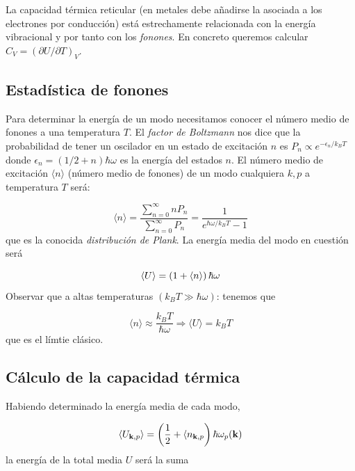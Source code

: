 La capacidad térmica reticular (en metales debe añadirse la asociada a los electrones por conducción) está estrechamente relacionada con la energía vibracional y por tanto con los \textit{fonones}. En concreto queremos calcular $C_V = (\partial U / \partial T)_V$. 

\subsection{Estadística de fonones}

Para determinar la energía de un modo necesitamos conocer el número medio de fonones a una temperatura $T$. El \textit{factor de Boltzmann} nos dice que la probabilidad de tener un oscilador en un estado de excitación $n$ es $P_n \propto e^{-\epsilon_n/k_B T}$ donde $\epsilon_n = (1/2+n)\hbar \omega$ es la energía del estados $n$. El número medio de excitación $\langle n \rangle$ (número medio de fonones) de un modo cualquiera $k,p$ a temperatura $T$ será:

\begin{equation}
    \langle n \rangle = \frac{\sum_{n=0}^\infty n P_n}{\sum_{n=0}^{\infty} P_n} = \frac{1}{e^{\hbar \omega/k_B T} -1}
\end{equation}
que es la conocida \textit{distribución de Plank}. La energía media del modo en cuestión será

\begin{equation}
    \langle U \rangle = \left( 1+\langle n \rangle \right) \hbar \omega
\end{equation}
Observar que a altas temperaturas $(k_B T \gg \hbar \omega)$: tenemos que

\begin{equation}
    \langle n \rangle \approx \frac{k_B T}{\hbar \omega} \Longrightarrow \langle U \rangle = k_B T
\end{equation}
que es el límtie clásico. 
\subsection{Cálculo de la capacidad térmica}

Habiendo determinado la energía media de cada modo,

\begin{equation*}
    \langle U_{\mathbf{k},p} \rangle = \left( \frac{1}{2} + \langle n_{\mathbf{k},p}  \right) \hbar \omega_p (\mathbf{k})   \label{Ec:05-02-04}
\end{equation*}
la energía de la total media $U$ será la suma 

